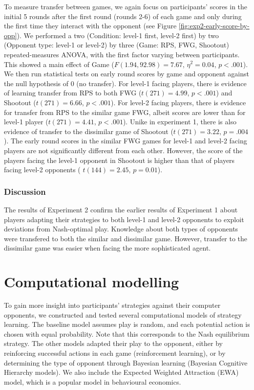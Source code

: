 \documentclass[man,floatsintext]{apa6}
\begin{document}
To measure transfer between games, we again focus on participants' scores in the initial 5 rounds after the first round (rounds 2-6) of each game and only during the first time they interact with the opponent (see Figure \ref{fig:exp2-early-score-by-opp}). We performed a two (Condition: level-1 first, level-2 first) by two (Opponent type: level-1 or level-2) by three (Game: RPS, FWG, Shootout) repeated-measures ANOVA, with the first factor varying between participants. This showed a main effect of Game (\(F(1.94,92.98) = 7.67\), \(\eta^{2} = 0.04\), \(p < .001\)).
We then run statistical tests on early round scores by game and opponent against the null hypothesis of 0 (no transfer). For level-1 facing players, there is evidence of learning transfer from RPS to both FWG (\(t(271) = 4.99\), \(p < .001\)) and Shootout (\(t(271) = 6.66\), \(p < .001\)). For level-2 facing players, there is evidence for transfer from RPS to the similar game FWG, albeit scores are lower than for level-1 player (\(t(271) = 4.41\), \(p < .001\)). Unike in experiment 1, there is also evidence of transfer to the dissimilar game of Shootout (\(t(271) = 3.22\), \(p = .004\)). The early round scores in the similar FWG games for level-1 and level-2 facing players are not significantly different from each other. However, the score of the players facing the level-1 opponent in Shootout is higher than that of players facing level-2 opponents ( \(t(144) = 2.45\), \(p = 0.01\)).

\hypertarget{discussion-1}{%
\subsubsection{Discussion}\label{discussion-1}}

The results of Experiment 2 confirm the earlier results of Experiment 1 about players adapting their strategies to both level-1 and level-2 opponents to exploit deviations from Nash-optimal play. Knowledge about both types of opponents were transfered to both the similar and dissimilar game. However, transfer to the dissimilar game was easier when facing the more sophisticated agent.

\hypertarget{computational-modelling}{%
\section{Computational modelling}\label{computational-modelling}}

To gain more insight into participants' strategies against their computer opponents, we constructed and tested several computational models of strategy learning. The baseline model assumes play is random, and each potential action is chosen with equal probability. Note that this corresponds to the Nash equilibrium strategy. The other models adapted their play to the opponent, either by reinforcing successful actions in each game (reinforcement learning), or by determining the type of opponent through Bayesian learning (Bayesian Cognitive Hierarchy models). We also include the Expected Weighted Attraction (EWA) model, which is a popular model in behavioural economics.
\end{document}
